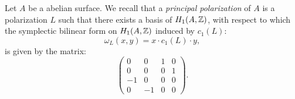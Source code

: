 



Let $A$ be a abelian surface. We recall that a \emph{principal polarization} of $A$ is a polarization $L$ such that there exists a basis of $H_1(A,\mathbb{Z})$, with respect to which the symplectic bilinear form on $H_1(A,\mathbb{Z})$ induced by $c_1(L)$:
\begin{equation}
\omega_L(x,y)=x\cdot c_1(L)\cdot y,
\label{symplecticprinc}
\end{equation}
is given by the matrix:
$$\left( {\begin{array}{cccc}
   0 & 0 & 1 & 0 \\    0 &  0 & 0 & 1\\ -1 & 0 & 0 & 0\\ 0 & -1 & 0 & 0     
   \end{array} } \right).$$

